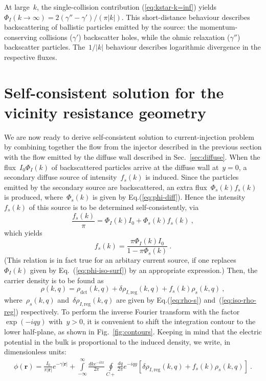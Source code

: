 \documentclass[preprint,aps,eqsecnum, prb]{revtex4-1}
\newcommand{\dct}[1]{{#1}_\mathrm{dct}}
\begin{document}
At large~$k$, the single-collision contribution (\ref{eq:kstar-k=inf}) yields
$\Phi_I(k\to \infty) = 2 (\gamma'' - \gamma')/(\pi |k|)$.
This short-distance behaviour describes
backscattering of ballistic particles emitted by the source: the
momentum-conserving collisions ($\gamma'$) backscatter holes,
while the ohmic relaxation ($\gamma''$) backscatter particles.
The~$1/|k|$ behaviour describes logarithmic divergence in the
respective fluxes.

\section{Self-consistent solution for the vicinity resistance geometry}
\label{sec:vicinity}

We are now ready to derive self-consistent solution to current-injection
problem by combining together the flow from the injector described in the
previous section with the flow emitted by the diffuse wall described in
Sec.~\ref{sec:diffuse}. When the flux~$I_0 \Phi_I(k)$ of
backscattered particles arrive at the diffuse wall at~$y = 0$,
a secondary diffuse source of intensity~$f_s(k)$
is induced. Since the particles emitted by the secondary source
are backscattered, an extra flux~$\Phi_s(k) f_s(k)$ is produced,
where~$\Phi_s(k)$ is given by Eq.(\ref{eq:phi-diff}).
Hence  the intensity~$f_{s}(k)$ of this source is to be determined
self-consistently, via
\begin{equation}
  \frac{f_s(k)}{\pi} = \Phi_I(k) I_0 + \Phi_s(k) f_{s}(k)
  \ ,
\end{equation}
which yields
\begin{equation}
  f_{s}(k) = \frac{\pi \Phi_I(k) I_0}{1 - \pi \Phi_s(k)}
  \ .
\end{equation}
(This relation is in fact true for an arbitary current source,
if one replaces~$\Phi_I(k)$ given by Eq.~(\ref{eq:phi-iso-surf})
by an appropriate expression.)
Then, the carrier density is to be found as
\begin{equation}
  \rho(k, q) =\dct{\rho}(k, q) + \delta\rho_{I,\mathrm{reg}}(k, q)
  + f_{s}(k) \rho_{s}(k, q)
  \ ,
\end{equation}
where~$\rho_{s}(k, q)$ and~$\delta\rho_{I,\mathrm{reg}}(k, q)$
are given by Eq.(\ref{eq:rho-s})
and~(\ref{eq:iso-rho-reg}) respectively. To perform the inverse
Fourier transform with the factor~$\exp(-i q y)$ with~$y > 0$,
it is convenient to shift the integration contour
to the lower half-plane, as shown in Fig.~\ref{fig:contours}.
Keeping in mind that the electric potential in the bulk is
proportional to the induced density, we write, in dimensionless
units:
\begin{align}
  \phi({\bm r}) = \frac{I_0}{\pi |{\bm r}|} e^{-\gamma |{\bm r}|}
  + \int\limits_{-\infty}^{\infty} \frac{dk e^{-ikx}}{2\pi}
  \oint\limits_{C+} \frac{dq}{2\pi} e^{-iqy}
  \left[\delta\rho_{I, \mathrm{reg}}(k, q)
  + f_s(k) \rho_{s}(k, q) \right]\ .
\end{align}
\end{document}
